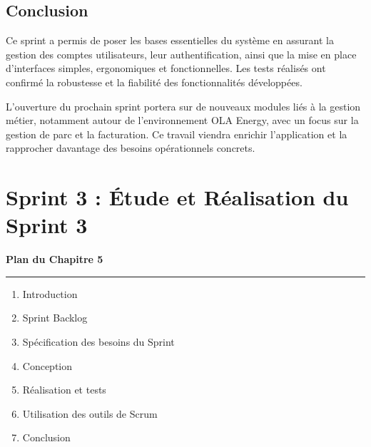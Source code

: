 \documentclass[a4paper,11pt]{report}
\begin{document}
\newpage
\section{Conclusion}

Ce sprint a permis de poser les bases essentielles du système en assurant la gestion des comptes utilisateurs, leur authentification, ainsi que la mise en place d’interfaces simples, ergonomiques et fonctionnelles. Les tests réalisés ont confirmé la robustesse et la fiabilité des fonctionnalités développées.

\bigskip

L'ouverture du prochain sprint portera sur de nouveaux modules liés à la gestion métier, notamment autour de l’environnement OLA Energy, avec un focus sur la gestion de parc et la facturation. Ce travail viendra enrichir l’application et la rapprocher davantage des besoins opérationnels concrets.



\newpage

\chapter{Sprint 3 : Étude et Réalisation du Sprint 3}

\vspace*{2cm}

\begin{center}
    {\LARGE \textbf{Plan du Chapitre 5}}
\end{center}

\vspace{1cm}

\noindent
\textcolor{gray!70}{\rule{\textwidth}{0.4pt}}

\vspace{1cm}

\begin{enumerate}[label=\textbf{\large\arabic*.}, leftmargin=*, itemsep=1.2em]
    \item Introduction
    \item Sprint Backlog
    \item Spécification des besoins du Sprint
    \item Conception
    \item Réalisation et tests
    \item Utilisation des outils de Scrum
    \item Conclusion
\end{enumerate}

\vspace{1cm}
\end{document}
